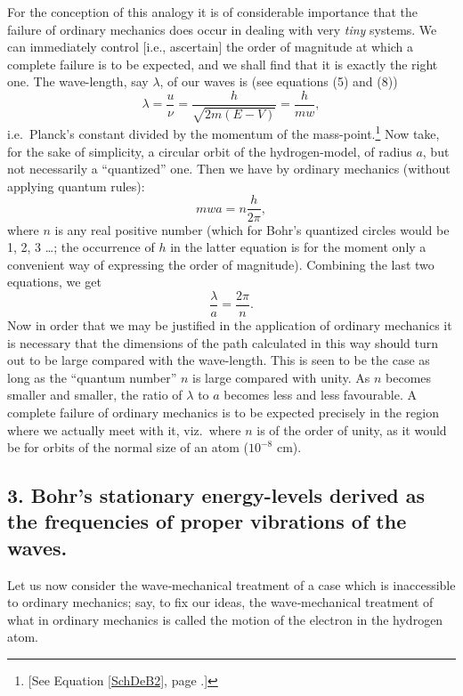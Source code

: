 For the conception of this analogy it is of considerable importance that
the failure of ordinary mechanics does occur in dealing with very
\emph{tiny} systems. We can immediately control {[}i.e., ascertain{]}
the order of magnitude at which a complete failure is to be expected,
and we shall find that it is exactly the right one. The wave-length, say
$\lambda$, of our waves is (see equations (5) and (8))
\begin{equation}
\lambda = \frac{u}{\nu} = \frac{h}{\sqrt{2m(E-V)}} = \frac{h}{mw} ,
\end{equation}
i.e.\ Planck's constant divided by the momentum of the
mass-point.\footnote{{[}See Equation \eqref{SchDeB2}, page \pageref{SchDeB2}.{]}} Now take, for
the sake of simplicity, a circular orbit of the hydrogen-model, of
radius $a$, but not necessarily a ``quantized'' one. Then we have
by ordinary mechanics (without applying quantum rules):
\begin{equation*}
mwa = n\frac{h}{2\pi} , 
\end{equation*}
where $n$ is any real positive number (which for Bohr's quantized
circles would be 1, 2, 3 \ldots ; the occurrence of $h$ in the
latter equation is for the moment only a convenient way of expressing
the order of magnitude). Combining the last two equations, we get
\begin{equation*}
\frac{\lambda}{a} = \frac{2\pi}{n}.
\end{equation*}
Now in order that we may be justified in the application of ordinary
mechanics it is necessary that the dimensions of the path calculated in
this way should turn out to be large compared with the wave-length. This
is seen to be the case as long as the ``quantum number'' $n$ is
large compared with unity. As $n$ becomes smaller and smaller, the
ratio of $\lambda$ to $a$ becomes less and less favourable. A
complete failure of ordinary mechanics is to be expected precisely in
the region where we actually meet with it, viz.\ where $n$ is of the
order of unity, as it would be for orbits of the normal size of an atom
($10^{-8}$ cm).

\subsection{3. Bohr's stationary energy-levels derived as the frequencies of proper
vibrations of the waves.}

Let us now consider the wave‑mechanical treatment of a case which is
inaccessible to ordinary mechanics; say, to fix our ideas, the
wave‑mechanical treatment of what in ordinary mechanics is called the
motion of the electron in the hydrogen atom.

